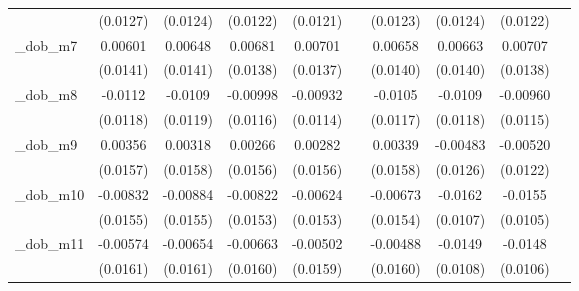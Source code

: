 \begin{table}[htbp]
\begin{tabular}{l*{9}{c}}
            &    (0.0127)         &    (0.0124)         &    (0.0122)         &    (0.0121)         &                     &    (0.0123)         &    (0.0124)         &    (0.0122)         &                     \\
[1em]
\_dob\_m7     &     0.00601         &     0.00648         &     0.00681         &     0.00701         &                     &     0.00658         &     0.00663         &     0.00707         &                     \\
            &    (0.0141)         &    (0.0141)         &    (0.0138)         &    (0.0137)         &                     &    (0.0140)         &    (0.0140)         &    (0.0138)         &                     \\
[1em]
\_dob\_m8     &     -0.0112         &     -0.0109         &    -0.00998         &    -0.00932         &                     &     -0.0105         &     -0.0109         &    -0.00960         &                     \\
            &    (0.0118)         &    (0.0119)         &    (0.0116)         &    (0.0114)         &                     &    (0.0117)         &    (0.0118)         &    (0.0115)         &                     \\
[1em]
\_dob\_m9     &     0.00356         &     0.00318         &     0.00266         &     0.00282         &                     &     0.00339         &    -0.00483         &    -0.00520         &                     \\
            &    (0.0157)         &    (0.0158)         &    (0.0156)         &    (0.0156)         &                     &    (0.0158)         &    (0.0126)         &    (0.0122)         &                     \\
[1em]
\_dob\_m10    &    -0.00832         &    -0.00884         &    -0.00822         &    -0.00624         &                     &    -0.00673         &     -0.0162         &     -0.0155         &                     \\
            &    (0.0155)         &    (0.0155)         &    (0.0153)         &    (0.0153)         &                     &    (0.0154)         &    (0.0107)         &    (0.0105)         &                     \\
[1em]
\_dob\_m11    &    -0.00574         &    -0.00654         &    -0.00663         &    -0.00502         &                     &    -0.00488         &     -0.0149         &     -0.0148         &                     \\
            &    (0.0161)         &    (0.0161)         &    (0.0160)         &    (0.0159)         &                     &    (0.0160)         &    (0.0108)         &    (0.0106)         &                     \\

\end{tabular}
\end{table}
